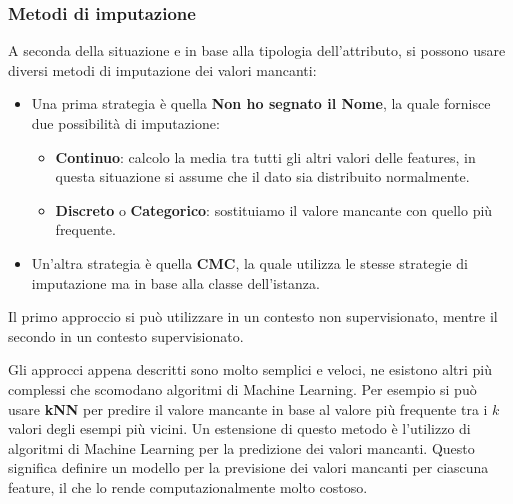 \subsubsection{Metodi di imputazione}
A seconda della situazione e in base alla tipologia dell'attributo, si possono
usare diversi metodi di imputazione dei valori mancanti:
\begin{itemize}
      \item Una prima strategia è quella \textbf{Non ho segnato il Nome}, la quale
            fornisce due possibilità di imputazione:
            \begin{itemize}
                  \item \textbf{Continuo}: calcolo la media tra tutti gli altri
                        valori delle features, in questa situazione si assume che il
                        dato sia distribuito normalmente.
                  \item \textbf{Discreto} o \textbf{Categorico}: sostituiamo il valore
                        mancante con quello più frequente.
            \end{itemize}
      \item Un'altra strategia è quella \textbf{CMC}, la quale utilizza le stesse
            strategie di imputazione ma in base alla classe dell'istanza.
\end{itemize}
Il primo approccio si può utilizzare in un contesto non supervisionato, mentre il
secondo in un contesto supervisionato.

Gli approcci appena descritti sono molto semplici e veloci, ne esistono altri più
complessi che scomodano algoritmi di Machine Learning. Per esempio si può usare
\textbf{kNN} per predire il valore mancante in base al valore più frequente tra
i $k$ valori degli esempi più vicini. Un estensione di questo metodo è l'utilizzo
di algoritmi di Machine Learning per la predizione dei valori mancanti. Questo
significa definire un modello per la previsione dei valori mancanti per ciascuna
feature, il che lo rende computazionalmente molto costoso.
